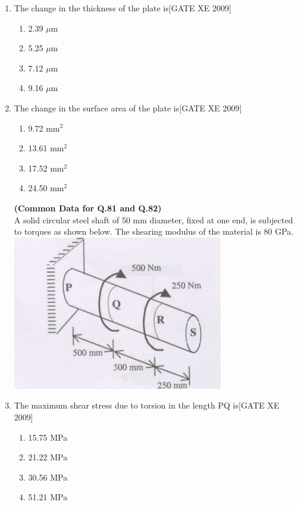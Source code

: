 \documentclass[journal,12pt,onecolumn]{IEEEtran}
\theoremstyle{remark}
\begin{document}
\begin{enumerate}
\begin{figure}[h]
\end{figure}



     \item The change in the thickness of the plate is\hfill[GATE XE 2009]
\begin{multicols}{2}
\begin{enumerate}
    \item 2.39 $\mu$m
    \item 5.25 $\mu$m
    \item 7.12 $\mu$m
    \item 9.16 $\mu$m

\end{enumerate}
\end{multicols}

\item The change in the surface area of the plate is\hfill[GATE XE 2009]
\begin{multicols}{2}
\begin{enumerate}
    \item 9.72 mm$^2$
    \item 13.61 mm$^2$
    \item 17.52 mm$^2$
    \item 24.50 mm$^2$
\end{enumerate}
\end{multicols}




  
\textbf{(Common Data for Q.81 and Q.82)}  \\
A solid circular steel shaft of 50 mm diameter, fixed at one end, is subjected to torques as shown below. The shearing modulus of the material is 80 GPa. \\


    
    \includegraphics[width=0.5\columnwidth]{figs/fig25.png}
  


\item The maximum shear stress due to torsion in the length PQ is\hfill[GATE XE 2009]
\begin{multicols}{2}
\begin{enumerate}
    \item 15.75 MPa
    \item 21.22 MPa
    \item 30.56 MPa
    \item 51.21 MPa
\end{enumerate}
\end{multicols}


\end{enumerate}
\end{document}
